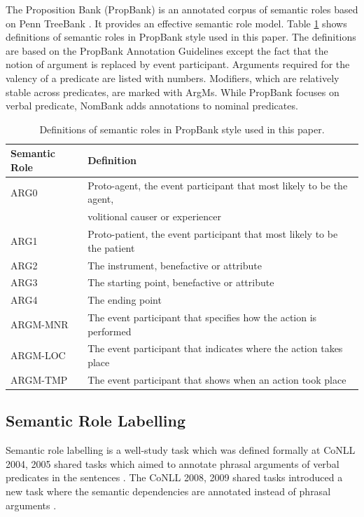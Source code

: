 \documentclass[a4paper]{article}
\begin{document}
The Proposition Bank (PropBank) is an annotated corpus of semantic roles based on Penn TreeBank \citep{palmer2005proposition}. It provides an effective semantic role model. Table \ref{tab:semantic} shows definitions of semantic roles in PropBank style used in this paper. The definitions are based on the PropBank Annotation Guidelines \citep{bonial2010propbank} except the fact that the notion of argument is replaced by event participant. Arguments required for the valency of a predicate are listed with numbers. Modifiers, which are relatively stable across predicates, are marked with ArgMs. While PropBank focuses on verbal predicate, NomBank adds annotations to nominal predicates. 


\begin{table}[t]
\centering
\begin{tabular}{l|l}
\textbf{Semantic Role}  &   \textbf{Definition} \\ \hline
ARG0                    &   Proto-agent, the event participant that most likely to be the agent, \\ 
                        &   volitional causer or experiencer \\ \hline
ARG1                    &   Proto-patient, the event participant that most likely to be the patient \\ \hline
ARG2                    &   The instrument, benefactive or attribute \\ \hline
ARG3                    &   The starting point, benefactive or attribute \\ \hline
ARG4                    &   The ending point \\ \hline
ARGM-MNR                &   The event participant that specifies how the action is performed \\ \hline
ARGM-LOC                &   The event participant that indicates where the action takes place \\ \hline
ARGM-TMP                &   The event participant that shows when an action took place \\ \hline
\end{tabular}
\caption{\label{tab:semantic} Definitions of semantic roles in PropBank style used in this paper.}
\end{table}


\subsection{Semantic Role Labelling} \label{sec:srl}
Semantic role labelling is a well-study task which was defined formally at CoNLL 2004, 2005 shared tasks which aimed to annotate phrasal arguments of verbal predicates in the sentences \citep{carreras-marquez:2004:CONLL, carreras-marquez:2005:CoNLL}. The CoNLL 2008, 2009 shared tasks introduced a new task where the semantic dependencies are annotated instead of phrasal arguments \citep{surdeanu-EtAl:2008:CONLL, hajivc-EtAl:2009:CoNLL-2009-ST}. 
\end{document}
